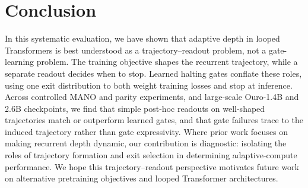 \documentclass[10pt]{article} %
\begin{document}
\section{Conclusion}

In this systematic evaluation, we have shown that adaptive depth in looped Transformers is best understood as a trajectory--readout problem, not a gate-learning problem. The training objective shapes the recurrent trajectory, while a separate readout decides when to stop. Learned halting gates conflate these roles, using one exit distribution to both weight training losses and stop at inference. Across controlled MANO and parity experiments, and large-scale Ouro-1.4B and 2.6B checkpoints, we find that simple post-hoc readouts on well-shaped trajectories match or outperform learned gates, and that gate failures trace to the induced trajectory rather than gate expressivity. Where prior work focuses on making recurrent depth dynamic, our contribution is diagnostic: isolating the roles of trajectory formation and exit selection in determining adaptive-compute performance. We hope this trajectory--readout perspective motivates future work on alternative pretraining objectives and looped Transformer architectures.



\end{document}
